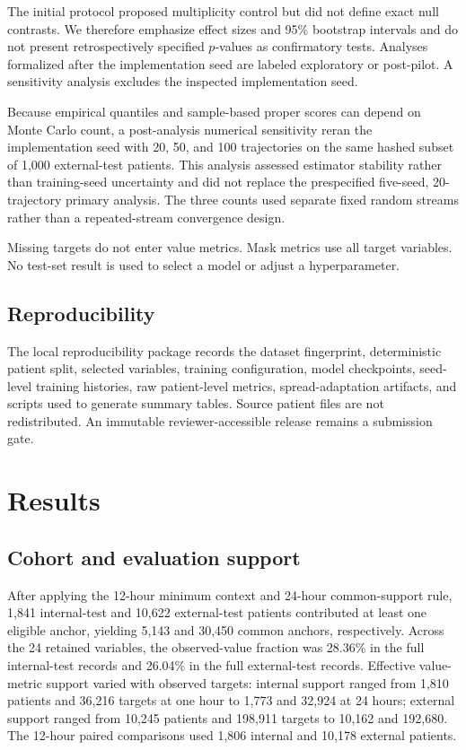 \documentclass[conference]{IEEEtran}
\begin{document}
The initial protocol proposed multiplicity control but did not define exact
null contrasts. We therefore emphasize effect sizes and 95\% bootstrap
intervals and do not present retrospectively specified \(p\)-values as
confirmatory tests. Analyses formalized after the implementation seed are
labeled exploratory or post-pilot. A sensitivity analysis excludes the
inspected implementation seed.

Because empirical quantiles and sample-based proper scores can depend on Monte
Carlo count, a post-analysis numerical sensitivity reran the implementation
seed with 20, 50, and 100 trajectories on the same hashed subset of 1,000
external-test patients. This analysis assessed estimator stability rather than
training-seed uncertainty and did not replace the prespecified five-seed,
20-trajectory primary analysis. The three counts used separate fixed random
streams rather than a repeated-stream convergence design.

Missing targets do not enter value metrics. Mask metrics use all target
variables. No test-set result is used to select a model or adjust a
hyperparameter.

\subsection{Reproducibility}\label{reproducibility}

The local reproducibility package records the dataset fingerprint, deterministic patient
split, selected variables, training configuration, model checkpoints,
seed-level training histories, raw patient-level metrics, spread-adaptation
artifacts, and scripts used to generate summary tables. Source patient files
are not redistributed. An immutable reviewer-accessible release remains a
submission gate.

\section{Results}\label{results}

\subsection{Cohort and evaluation support}\label{cohort-and-evaluation-support}

After applying the 12-hour minimum context and 24-hour common-support rule,
1,841 internal-test and 10,622 external-test patients contributed at least one
eligible anchor, yielding 5,143 and 30,450 common anchors, respectively. Across
the 24 retained variables, the observed-value fraction was 28.36\% in the full
internal-test records and 26.04\% in the full external-test records. Effective
value-metric support varied with observed targets: internal support ranged
from 1,810 patients and 36,216 targets at one hour to 1,773 and 32,924 at 24
hours; external support ranged from 10,245 patients and 198,911 targets to
10,162 and 192,680. The 12-hour paired comparisons used 1,806 internal and
10,178 external patients.
\end{document}
